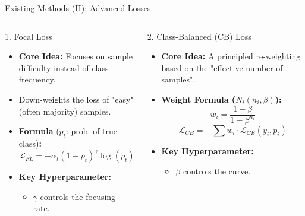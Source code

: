 \documentclass[aspectratio=169]{beamer}
\def \bblock{\begin{beamerboxesrounded}[upper=uppercolor,lower=lowercolor,shadow=true]}
\def \eblock{\end{beamerboxesrounded}}
\begin{document}
\begin{frame}{Existing Methods (II): Advanced Losses}

\vspace{0.03\textwidth}

\begin{columns}[T]

  \bblock{1. Focal Loss}
    \begin{itemize}
        \item \textbf{Core Idea:} Focuses on \alert{sample difficulty} instead of class frequency.
        \item Down-weights the loss of "easy" (often majority) samples.
        \item \textbf{Formula} ($p_t$: prob. of true class)\textbf{:}
              $$ \mathcal{L}_{FL} = - \alpha_t (1 - p_t)^{\gamma} \log(p_t) $$
        \item \textbf{Key Hyperparameter:}
              \begin{itemize}
                  \item $\gamma$ controls the focusing rate.
              \end{itemize}
    \end{itemize}
  \eblock

  \bblock{2. Class-Balanced (CB) Loss}
    \begin{itemize}
        \item \textbf{Core Idea:} A principled re-weighting based on the "effective number of samples".
        \item \textbf{Weight Formula ($N_i(n_i, \beta)$):}
              $$ w_i = \frac{1 - \beta}{1 - \beta^{n_i}} $$
              $$ \mathcal{L}_{CB} = - \sum w_i \cdot \mathcal{L}_{CE}(y_i, p_i) $$
        \item \textbf{Key Hyperparameter:}
              \begin{itemize}
                  \item $\beta$ controls the curve.
              \end{itemize}
    \end{itemize}
  \eblock

\end{columns}
\end{frame}

\end{document}
